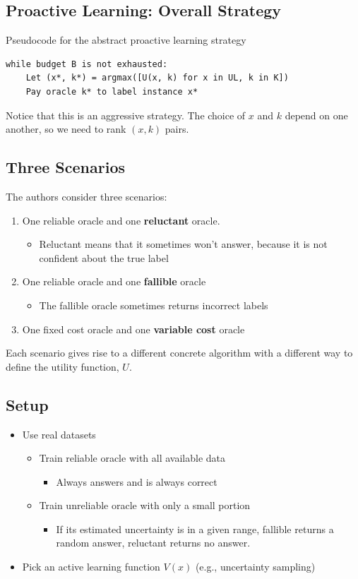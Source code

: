 \documentclass[10pt]{article}
\begin{document}
\subsection*{Proactive Learning: Overall Strategy}
Pseudocode for the abstract proactive learning strategy
\begin{verbatim}
while budget B is not exhausted:
    Let (x*, k*) = argmax([U(x, k) for x in UL, k in K])
    Pay oracle k* to label instance x*
\end{verbatim}
Notice that this is an aggressive strategy.  The choice of $x$ and $k$ depend on one another, so we need to rank $(x, k)$ pairs.

\subsection*{Three Scenarios}
The authors consider three scenarios:
\begin{enumerate}
	\item One reliable oracle and one \textbf{reluctant} oracle.
	\begin{itemize}
	    \item Reluctant means that it sometimes won't answer, because it is not confident about the true label
    \end{itemize}
    \item One reliable oracle and one \textbf{fallible} oracle
    \begin{itemize}
	    \item The fallible oracle sometimes returns incorrect labels
    \end{itemize}
    \item One fixed cost oracle and one \textbf{variable cost} oracle
\end{enumerate}
Each scenario gives rise to a different concrete algorithm with a different way to define the utility function, $U$.

\subsection*{Setup}
\begin{itemize}
	\item Use real datasets
	\begin{itemize}
	    \item Train reliable oracle with all available data
	    \begin{itemize}
	        \item Always answers and is always correct
        \end{itemize}
	    \item Train unreliable oracle with only a small portion
	    \begin{itemize}
	        \item If its estimated uncertainty is in a given range, fallible returns a random answer, reluctant returns no answer.
        \end{itemize}
    \end{itemize}
	\item Pick an active learning function $V(x)$ (e.g., uncertainty sampling)
\end{itemize}
\end{document}
